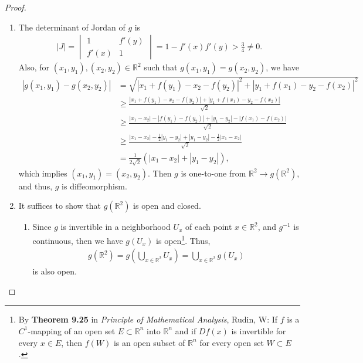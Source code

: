\documentclass[11pt]{article}
\theoremstyle{definition}
\numberwithin{equation}{subsection}
\begin{document}
\begin{proof}
~\begin{enumerate}[label=(\alph*)]
    \item The determinant of Jordan of $g$ is
    \begin{align*}
        |J| = \begin{vmatrix}
            1 & f'(y) \\
            f'(x) & 1
        \end{vmatrix} = 1 - f'(x)f'(y) > \frac{3}{4} \neq 0.
    \end{align*}
    Also, for $(x_1, y_1), (x_2, y_2) \in \mathbb{R}^2$ such that $g(x_1, y_1) = g(x_2, y_2)$, we have
    \begin{align*}
        |g(x_1, y_1) - g(x_2, y_2)| & = \sqrt{|x_1 + f(y_1) - x_2 - f(y_2)|^2 + |y_1 + f(x_1) - y_2 - f(x_2)|^2} \\
        & \geq \frac{|x_1 + f(y_1) - x_2 - f(y_2)| + |y_1 + f(x_1) - y_2 - f(x_2)|}{\sqrt{2}} \\
        & \geq \frac{|x_1 - x_2| - |f(y_1) - f(y_2)| + |y_1 - y_2| - |f(x_1) - f(x_2)|}{\sqrt{2}} \\
        & \geq \frac{|x_1 - x_2| - \frac{1}{2}|y_1 - y_2| + |y_1 - y_2| - \frac{1}{2}|x_1 - x_2|}{\sqrt{2}} \\
        & = \frac{1}{2\sqrt{2}} \left(|x_1 - x_2| + |y_1 - y_2| \right),
    \end{align*}
    which implies $(x_1, y_1) = (x_2, y_2)$. Then $g$ is one-to-one from $\mathbb{R}^2 \to g(\mathbb{R}^2)$, and thus, $g$ is diffeomorphism.
    
    \item It suffices to show that $g(\mathbb{R}^2)$ is open and closed.
    \begin{enumerate}[label=\arabic*)]
        \item Since $g$ is invertible in a neighborhood $U_x$ of each point $x \in \mathbb{R}^2$, and $g^{-1}$ is continuous, then we have $g(U_x)$ is open\footnote{By {\bf Theorem 9.25} in {\it Principle of Mathematical Analysis}, Rudin, W\cite{11}: If $f$ is a $C^1$-mapping of an open set $E \subset \mathbb{R}^n$ into $\mathbb{R}^n$ and if $Df(x)$ is invertible for every $x \in E$, then $f(W)$ is an open subset of $\mathbb{R}^n$ for every open set $W \subset E$.}. Thus,
        \begin{align*}
            g(\mathbb{R}^2) = g \left( \bigcup_{x \in \mathbb{R}^2} U_x \right) = \bigcup_{x \in \mathbb{R}^2} g(U_x)
        \end{align*}
        is also open.
        

\end{enumerate}
\end{enumerate}
\end{proof}
\end{document}

